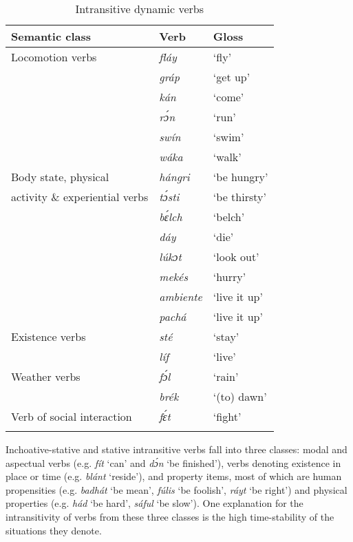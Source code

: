 \begin{table}
\caption{Intransitive dynamic verbs}
\label{tab:key:9.3}

\begin{tabularx}{\textwidth}{lXX}
\lsptoprule
Semantic class & Verb & Gloss\\
\midrule 
Locomotion verbs & \itshape fláy & ‘fly’\\
& \itshape gráp & ‘get up’\\
& \itshape kán & ‘come’\\
& \itshape rɔ́n & ‘run’\\
& \itshape swín & ‘swim’\\
& \itshape wáka & ‘walk’\\

\tablevspace
Body state, physical & \itshape hángri & ‘be hungry’\\
activity \& experiential verbs & \itshape tɔ́sti & ‘be thirsty’\\
& \itshape bɛ́lch & ‘belch’\\
& \itshape dáy & ‘die’\\
& \itshape lúkɔt & ‘look out’\\
& \itshape mekés & ‘hurry’\\
& \itshape ambiente & ‘live it up’\\
& \itshape pachá & ‘live it up’\\

\tablevspace
Existence verbs & \itshape sté & ‘stay’\\
& \itshape líf & ‘live’\\

\tablevspace
Weather verbs & \itshape fɔ́l & ‘rain’\\
& \itshape brék & ‘(to) dawn’\\

\tablevspace
Verb of social interaction & \itshape fɛ́t & ‘fight’\\
\lspbottomrule
\end{tabularx}
\end{table}
Inchoative-stative and stative intransitive verbs fall into three classes: modal and aspectual verbs (e.g. \textit{fít} ‘can’ and \textit{dɔ́n} ‘be finished’), verbs denoting existence in place or time (e.g. \textit{blánt} ‘reside’), and property items, most of which are human propensities (e.g. \textit{badhát} ‘be mean’, \textit{fúlis} ‘be foolish’, \textit{ráyt} ‘be right’) and physical properties (e.g. \textit{hád} ‘be hard’, \textit{sáful} ‘be slow’). One explanation for the intransitivity of verbs from these three classes is the high time-stability of the situations they denote.

